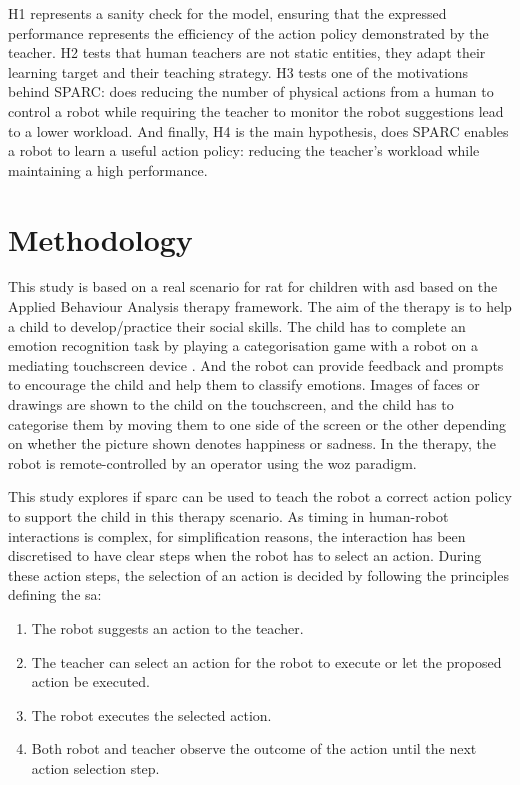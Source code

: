 H1 represents a sanity check for the model, ensuring that the expressed performance represents the efficiency of the action policy demonstrated by the teacher. H2 tests that human teachers are not static entities, they adapt their learning target and their teaching strategy. H3 tests one of the motivations behind SPARC: does reducing the number of physical actions from a human to control a robot while requiring the teacher to monitor the robot suggestions lead to a lower workload. And finally, H4 is the main hypothesis, does SPARC enables a robot to learn a useful action policy: reducing the teacher's workload while maintaining a high performance.

\section{Methodology}

This study is based on a real scenario for \gls{rat} for children with \gls{asd} based on the Applied Behaviour Analysis therapy framework. The aim of the therapy is to help a child to develop/practice their social skills. The child has to complete an emotion recognition task by playing a categorisation game with a robot on a mediating touchscreen device \cite{baxter2012touchscreen}. And the robot can provide feedback and prompts to encourage the child and help them to classify emotions. Images of faces or drawings are shown to the child on the touchscreen, and the child has to categorise them by moving them to one side of the screen or the other depending on whether the picture shown denotes happiness or sadness. In the therapy, the robot is remote-controlled by an operator using the \acrlong{woz} paradigm.%

This study explores if \gls{sparc} can be used to teach the robot a correct action policy to support the child in this therapy scenario. As timing in human-robot interactions is complex, for simplification reasons, the interaction has been discretised to have clear steps when the robot has to select an action. During these action steps, the selection of an action is decided by following the principles defining the \gls{sa}:
\begin{enumerate}
	\item The robot suggests an action to the teacher.
	\item The teacher can select an action for the robot to execute or let the proposed action be executed.
	\item The robot executes the selected action.
	\item Both robot and teacher observe the outcome of the action until the next action selection step.
\end{enumerate}

